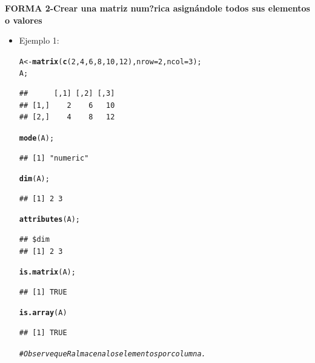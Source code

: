 \documentclass[12pt,letterpaper]{article}\usepackage[]{graphicx}\usepackage[]{color}
\makeatletter
\newcommand{\hlnum}[1]{\textcolor[rgb]{0.686,0.059,0.569}{#1}}%
\newcommand{\hlcom}[1]{\textcolor[rgb]{0.678,0.584,0.686}{\textit{#1}}}%
\newcommand{\hlstd}[1]{\textcolor[rgb]{0.345,0.345,0.345}{#1}}%
\newcommand{\hlkwb}[1]{\textcolor[rgb]{0.69,0.353,0.396}{#1}}%
\newcommand{\hlkwc}[1]{\textcolor[rgb]{0.333,0.667,0.333}{#1}}%
\newcommand{\hlkwd}[1]{\textcolor[rgb]{0.737,0.353,0.396}{\textbf{#1}}}%
\newenvironment{kframe}{%
 \def\at@end@of@kframe{}%
 \ifinner\ifhmode%
  \def\at@end@of@kframe{\end{minipage}}%
  \begin{minipage}{\columnwidth}%
 \fi\fi%
 \def\FrameCommand##1{\hskip\@totalleftmargin \hskip-\fboxsep
 \colorbox{shadecolor}{##1}\hskip-\fboxsep
     \hskip-\linewidth \hskip-\@totalleftmargin \hskip\columnwidth}%
 \MakeFramed {\advance\hsize-\width
   \@totalleftmargin\z@ \linewidth\hsize
   \@setminipage}}%
 {\par\unskip\endMakeFramed%
 \at@end@of@kframe}
\newenvironment{knitrout}{}{} %
\makeatother
\begin{document}
\textbf {FORMA 2-Crear una matriz num?rica asign\'andole todos sus elementos o valores}
\begin{itemize} 
\item Ejemplo 1:
\begin{knitrout}
\color{fgcolor}\begin{kframe}
\begin{alltt}
\hlstd{A} \hlkwb{<-} \hlkwd{matrix}\hlstd{(}\hlkwd{c}\hlstd{(}\hlnum{2}\hlstd{,} \hlnum{4}\hlstd{,} \hlnum{6}\hlstd{,} \hlnum{8}\hlstd{,} \hlnum{10}\hlstd{,} \hlnum{12}\hlstd{),} \hlkwc{nrow}\hlstd{=}\hlnum{2}\hlstd{,} \hlkwc{ncol}\hlstd{=}\hlnum{3}\hlstd{);}
\hlstd{A;}
\end{alltt}
\begin{verbatim}
##      [,1] [,2] [,3]
## [1,]    2    6   10
## [2,]    4    8   12
\end{verbatim}
\begin{alltt}
\hlkwd{mode}\hlstd{(A);}
\end{alltt}
\begin{verbatim}
## [1] "numeric"
\end{verbatim}
\begin{alltt}
\hlkwd{dim}\hlstd{(A);}
\end{alltt}
\begin{verbatim}
## [1] 2 3
\end{verbatim}
\begin{alltt}
\hlkwd{attributes}\hlstd{(A);}
\end{alltt}
\begin{verbatim}
## $dim
## [1] 2 3
\end{verbatim}
\begin{alltt}
\hlkwd{is.matrix}\hlstd{(A);}
\end{alltt}
\begin{verbatim}
## [1] TRUE
\end{verbatim}
\begin{alltt}
\hlkwd{is.array}\hlstd{(A)}
\end{alltt}
\begin{verbatim}
## [1] TRUE
\end{verbatim}
\begin{alltt}
\hlcom{# Observe que R almacena los elementos por columna.  }
\end{alltt}
\end{kframe}
\end{knitrout}
\end{itemize}
\end{document}

